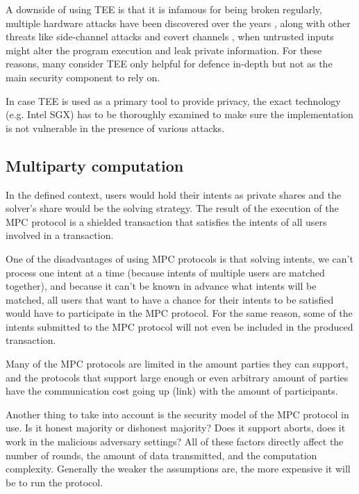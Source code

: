 \documentclass[final]{msc}
\begin{document}
A downside of using TEE is that it is infamous for being broken regularly, multiple hardware attacks have been discovered over the years \cite{sgxfail} \cite{downfall}, along with other threats like side-channel attacks and covert channels \cite{flash}, when untrusted inputs might alter the program execution and leak private information. For these reasons, many consider TEE only helpful for defence in-depth but not as the main security component to rely on.

In case TEE is used as a primary tool to provide privacy, the exact technology (e.g. Intel SGX) has to be thoroughly examined to make sure the implementation is not vulnerable in the presence of various attacks.

\subsection{Multiparty computation}

In the defined context, users would hold their intents as private shares and the solver's share would be the solving strategy. The result of the execution of the MPC protocol is a shielded transaction that satisfies the intents of all users involved in a transaction.

\hfill

One of the disadvantages of using MPC protocols is that solving intents, we can't process one intent at a time (because intents of multiple users are matched together), and because it can't be known in advance what intents will be matched, all users that want to have a chance for their intents to be satisfied would have to participate in the MPC protocol. For the same reason, some of the intents submitted to the MPC protocol will not even be included in the produced transaction.

Many of the MPC protocols are limited in the amount parties they can support, and the protocols that support large enough or even arbitrary amount of parties have the communication cost going up (link) with the amount of participants.

\hfill

Another thing to take into account is the security model of the MPC protocol in use. Is it honest majority or dishonest majority? Does it support aborts, does it work in the malicious adversary settings? All of these factors directly affect the number of rounds, the amount of data transmitted, and the computation complexity. Generally the weaker the assumptions are, the more expensive it will be to run the protocol.
\end{document}
